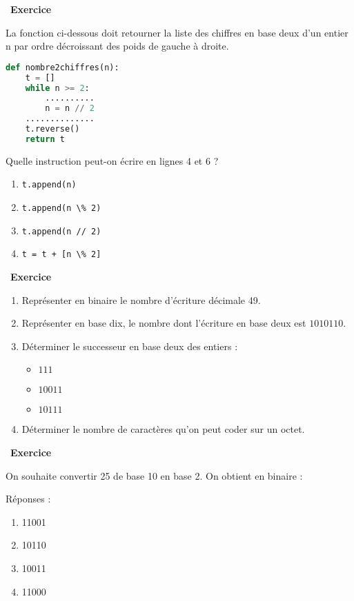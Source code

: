 \documentclass[
  11pt,
]{article}
\newcommand{\passthrough}[1]{#1}
\providecommand{\tightlist}{%
  \setlength{\itemsep}{0pt}\setlength{\parskip}{0pt}}
\newcounter{exo}
\newenvironment{exercice}[1]
{\par \medskip   \addtocounter{exo}{1} \noindent  
\begin{bclogo}[arrondi =0.1,   noborder = true, logo=\bccrayon, marge=4]{~\textbf{Exercice} \textbf{\theexo} {\itshape #1} }  \par}
{
\end{bclogo}
 \par \bigskip }
\newcounter{def}
\begin{document}
\begin{exercice}{}

La fonction ci-dessous doit retourner la liste des chiffres en base deux
d'un entier n par ordre décroissant des poids de gauche à droite.

\begin{lstlisting}[language=Python]
def nombre2chiffres(n):
    t = []
    while n >= 2:
        ..........
        n = n // 2
    ..............
    t.reverse()
    return t
\end{lstlisting}

Quelle instruction peut-on écrire en lignes 4 et 6 ?

\begin{enumerate}
\def\labelenumi{\arabic{enumi}.}
\tightlist
\item
  \passthrough{\lstinline!t.append(n)!}
\item
  \passthrough{\lstinline!t.append(n \% 2)!}
\item
  \passthrough{\lstinline!t.append(n // 2)!}
\item
  \passthrough{\lstinline!t = t + [n \% 2]!}
\end{enumerate}

\end{exercice}

\begin{exercice}{}

\begin{enumerate}
\def\labelenumi{\arabic{enumi}.}
\tightlist
\item
  Représenter en binaire le nombre d'écriture décimale 49.
\item
  Représenter en base dix, le nombre dont l'écriture en base deux est
  \(1010110\).
\item
  Déterminer le successeur en base deux des entiers :

  \begin{itemize}
  \tightlist
  \item
    \(111\)
  \item
    \(10011\)
  \item
    \(10111\)
  \end{itemize}
\item
  Déterminer le nombre de caractères qu'on peut coder sur un octet.
\end{enumerate}

\end{exercice}

\begin{exercice}{}

On souhaite convertir 25 de base 10 en base 2. On obtient en binaire :

Réponses :

\begin{enumerate}
\def\labelenumi{\arabic{enumi}.}
\tightlist
\item
  11001
\item
  10110
\item
  10011
\item
  11000
\end{enumerate}

\end{exercice}
\end{document}
